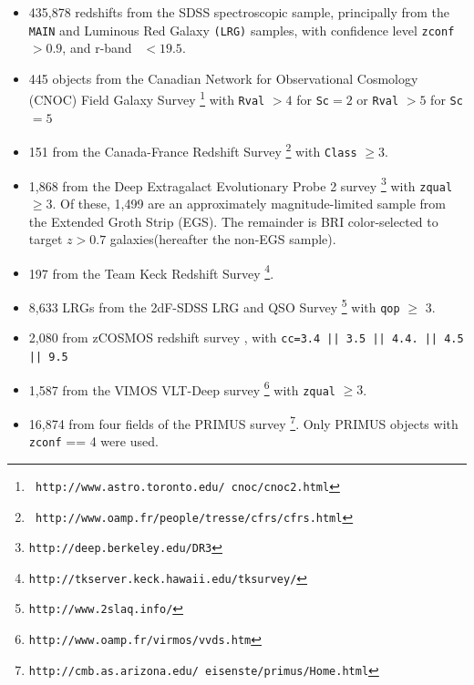 \documentclass[preprint]{aastex}
\begin{document}
\begin{itemize} 

    \item 435,878 redshifts from the SDSS spectroscopic sample,
principally from the \texttt{MAIN} and Luminous Red Galaxy \texttt{(LRG)}
samples, with confidence level \texttt{zconf}$ > 0.9$, and r-band
\cmodelmag\ $ <19.5$.


    \item 445 objects from the Canadian Network for Observational
Cosmology (CNOC) Field Galaxy Survey \cite[CNOC2;][]{yee00}\footnote{\tt
http://www.astro.toronto.edu/~cnoc/cnoc2.html} with \texttt{Rval} $>4$
for \texttt{Sc}$=2$ or \texttt{Rval} $> 5$ for \texttt{Sc}$=5$

    \item 151 from the Canada-France Redshift
Survey \cite[CFRS;][]{lilly95}\footnote{\tt
http://www.oamp.fr/people/tresse/cfrs/cfrs.html} with \texttt{Class} $\geq 3$.

    \item 1,868 from the Deep Extragalact Evolutionary Probe 2 survey
\citep[DEEP2;][]{weiner05}\footnote{\tt http://deep.berkeley.edu/DR3}
with \texttt{zqual} $\geq 3$. 
Of these, 1,499 are an approximately magnitude-limited sample from the Extended Groth Strip (EGS).
The remainder is BRI color-selected to target $z>0.7$ galaxies(hereafter the non-EGS sample). 

    \item 197 from the Team Keck Redshift Survey \cite[TKRS;][]{wirth04}\footnote{\tt http://tkserver.keck.hawaii.edu/tksurvey/}.

    \item 8,633 LRGs from the 2dF-SDSS LRG and QSO Survey \cite[2SLAQ;][]{cannon06}\footnote{\tt http://www.2slaq.info/} with \texttt{qop} $\geq$ 3.

    \item  2,080 from zCOSMOS redshift survey \cite{lilly07}, with  \texttt{cc=3.4 || 3.5 || 4.4.  || 4.5 || 9.5}
    
    \item 1,587 from the VIMOS VLT-Deep survey \cite[VVDS;][]{garilli08}\footnote{\tt http://www.oamp.fr/virmos/vvds.htm} with \texttt{zqual} $\geq 3$.

    \item 16,874 from four fields of the PRIMUS survey \cite[PRIMUS;][]{coil10}\footnote{\tt http://cmb.as.arizona.edu/~eisenste/primus/Home.html}.  Only PRIMUS objects with \texttt{zconf} == 4 were used.      
\end{itemize}
\end{document}
